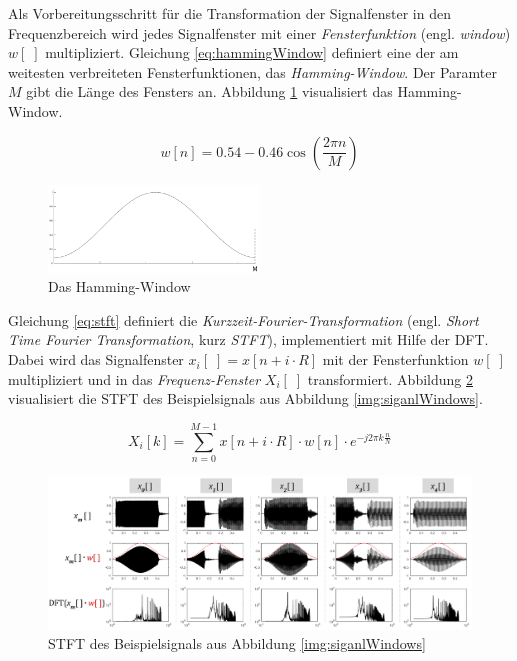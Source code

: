 Als Vorbereitungsschritt für die Transformation der Signalfenster in den Frequenzbereich wird jedes Signalfenster mit einer \emph{Fensterfunktion} (engl. \emph{window}) $w[\;]$ multipliziert.\cite[S. 69]{sprachverarbeitung} Gleichung \ref{eq:hammingWindow} definiert eine der am weitesten verbreiteten Fensterfunktionen, das \emph{Hamming-Window}. Der Paramter $M$ gibt die Länge des Fensters an. Abbildung \ref{img:hamming} visualisiert das Hamming-Window.\cite[S. 286]{dspGuide}

\begin{equation}
w[n] = 0.54 - 0.46 \cos(\frac{2\pi n}{M} )
\label{eq:hammingWindow}
\end{equation}

\begin{figure}[h]
	\centering
	\includegraphics[width=0.5\textwidth]{bilder/hamming01.png}
	\caption{Das Hamming-Window}
	\label{img:hamming}
\end{figure}

Gleichung \ref{eq:stft} definiert die \emph{Kurzzeit-Fourier-Transformation} (engl. \emph{Short Time Fourier Transformation}, kurz \emph{STFT}), implementiert mit Hilfe der DFT. Dabei wird das Signalfenster $x_i[\;] = x[n+i\cdot R]$ mit der Fensterfunktion $w[\;]$ multipliziert und in das \emph{Frequenz-Fenster} $X_i[\;]$ transformiert.\cite[S. 69]{sprachverarbeitung} \cite{stft} Abbildung \ref{img:stft02} visualisiert die STFT des Beispielsignals aus Abbildung \ref{img:siganlWindows}.

\begin{equation}
X_i[k] = \sum_{n=0}^{M-1} x[n+i\cdot R] \cdot w[n] \cdot e^{-j 2\pi k \frac{n}{N}}
\label{eq:stft}
\end{equation}

\begin{figure}[h]
	\centering
	\includegraphics[width=1\textwidth]{bilder/stft03.png}
	\caption{STFT des Beispielsignals aus Abbildung \ref{img:siganlWindows}}
	\label{img:stft02}
\end{figure}


